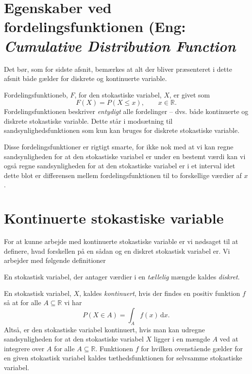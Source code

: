 \section{Egenskaber ved fordelingsfunktionen (Eng: \textit{Cumulative Distribution Function}}
Det bør, som for sidste afsnit, bemærkes at alt der bliver præsenteret i dette afsnit både gælder for diskrete og kontinuerte variable.
\begin{sæt}
  Fordelingsfunktioneb, $F$, for den stokastiske variabel, $X$, er givet som
  \[ 
  F(X) = P(X \leq x), \qquad x \in \mathbb{R}
  .\]
  Fordelingsfunktionen beskriver \textit{entydigt} alle fordelinger -- dvs. både kontinuerte og diskrete stokastiske variable. Dette står i modsætning til sandsynlighedsfunktionen som kun kan bruges for diskrete stokastiske variable.

  Disse fordelingsfunktioner er rigtigt smarte, for ikke nok med at vi kan regne sandsynligheden for at den stokastiske variabel er under en bestemt værdi kan vi også regne sandsynligheden for at den stokastiske variabel er i et interval idet dette blot er differensen mellem fordelingsfunktionen til to forskellige værdier af $x$.
\end{sæt}

\section{Kontinuerte stokastiske variable}
For at kunne arbejde med kontinuerte stokastiske variable er vi nødsaget til at definere, hvad forskellen på en sådan og en diskret stokastisk variabel er. Vi arbejder med følgende definitioner
\begin{definition}
  En stokastisk variabel, der antager værdier i en \textit{tællelig} mængde kaldes \textit{diskret}.
\end{definition}

\begin{definition}
  En stokastisk variabel, $X$, kaldes \textit{kontinuert}, hvis der findes en positiv funktion $f$ så at for alle $A \subseteq \mathbb{R}$ vi har
  \[ 
  P(X \in A) = \int_A f(x) \, \mathrm{d}x
  .\]
  Altså, er den stokastiske variabel kontinuert, hvis man kan udregne sandsynligheden for at den stokastiske variabel $X$ ligger i en mængde $A$ ved at integrere over $A$ for alle $A \subseteq \mathbb{R}$. Funktionen $f$ for hvilken ovenstående gælder for en given stokastisk variabel kaldes tæthedsfunktionen for selvsamme stokastiske variabel.
\end{definition}

